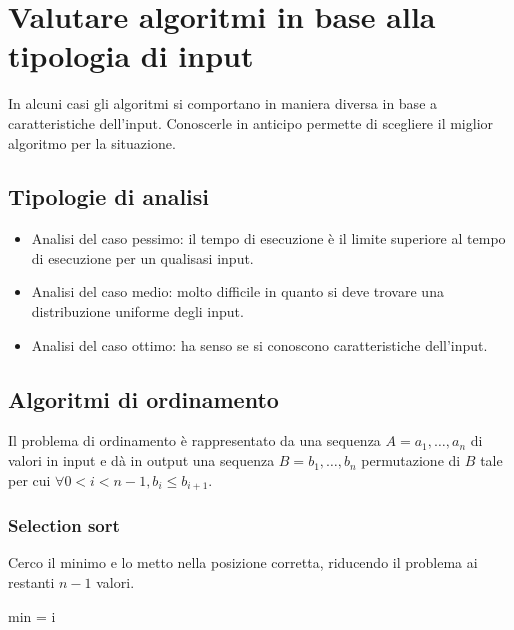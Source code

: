 \section{Valutare algoritmi in base alla tipologia di input}
In alcuni casi gli algoritmi si comportano in maniera diversa in base a caratteristiche dell'input. Conoscerle in anticipo permette di scegliere il miglior
algoritmo per la situazione. 
\subsection{Tipologie di analisi}
\begin{itemize}
\item Analisi del caso pessimo: il tempo di esecuzione \`e il limite superiore al tempo di esecuzione per un qualisasi input. 
\item Analisi del caso medio: molto difficile in quanto si deve trovare una distribuzione uniforme degli input.
\item Analisi del caso ottimo: ha senso se si conoscono caratteristiche dell'input.
\end{itemize}
\subsection{Algoritmi di ordinamento}
Il problema di ordinamento \`e rappresentato da una sequenza $A=a_1, \dots, a_n$ di valori in input e d\`a in output una sequenza $B=b_1, \dots, b_n$ 
permutazione di $B$ tale per cui $\forall 0<i<n-1, b_i\le b_{i+1}$.
\subsubsection{Selection sort}
Cerco il minimo e lo metto nella posizione corretta, riducendo il problema ai restanti $n-1$ valori.
\begin{algorithm}
\DontPrintSemicolon
{}

\caption{\protect{}}


\end{algorithm}

\begin{algorithm}
\DontPrintSemicolon
{}

\caption{\protect{}}
\Int min = i\;

\end{algorithm}
